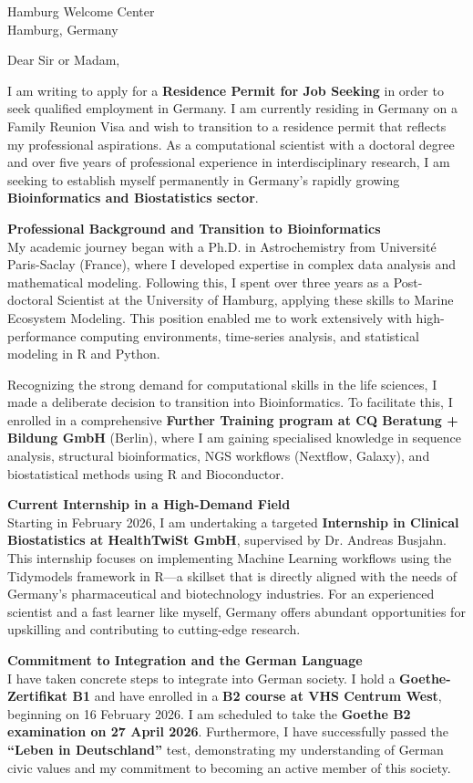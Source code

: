 \documentclass[fontsize=12pt,paper=a4,parskip=half]{scrlttr2}
\begin{document}
\begin{letter}{Hamburg Welcome Center\\Hamburg, Germany}

\opening{Dear Sir or Madam,}

I am writing to apply for a \textbf{Residence Permit for Job Seeking} in order to seek qualified employment in Germany. I am currently residing in Germany on a Family Reunion Visa and wish to transition to a residence permit that reflects my professional aspirations. As a computational scientist with a doctoral degree and over five years of professional experience in interdisciplinary research, I am seeking to establish myself permanently in Germany's rapidly growing \textbf{Bioinformatics and Biostatistics sector}.

\textbf{Professional Background and Transition to Bioinformatics}\\
My academic journey began with a Ph.D. in Astrochemistry from Université Paris-Saclay (France), where I developed expertise in complex data analysis and mathematical modeling. Following this, I spent over three years as a Post-doctoral Scientist at the University of Hamburg, applying these skills to Marine Ecosystem Modeling. This position enabled me to work extensively with high-performance computing environments, time-series analysis, and statistical modeling in R and Python.

Recognizing the strong demand for computational skills in the life sciences, I made a deliberate decision to transition into Bioinformatics. To facilitate this, I enrolled in a comprehensive \textbf{Further Training program at CQ Beratung + Bildung GmbH} (Berlin), where I am gaining specialised knowledge in sequence analysis, structural bioinformatics, NGS workflows (Nextflow, Galaxy), and biostatistical methods using R and Bioconductor.

\textbf{Current Internship in a High-Demand Field}\\
Starting in February 2026, I am undertaking a targeted \textbf{Internship in Clinical Biostatistics at HealthTwiSt GmbH}, supervised by Dr. Andreas Busjahn. This internship focuses on implementing Machine Learning workflows using the Tidymodels framework in R---a skillset that is directly aligned with the needs of Germany's pharmaceutical and biotechnology industries. For an experienced scientist and a fast learner like myself, Germany offers abundant opportunities for upskilling and contributing to cutting-edge research.

\textbf{Commitment to Integration and the German Language}\\
I have taken concrete steps to integrate into German society. I hold a \textbf{Goethe-Zertifikat B1} and have enrolled in a \textbf{B2 course at VHS Centrum West}, beginning on 16 February 2026. I am scheduled to take the \textbf{Goethe B2 examination on 27 April 2026}. Furthermore, I have successfully passed the \textbf{``Leben in Deutschland''} test, demonstrating my understanding of German civic values and my commitment to becoming an active member of this society.


\end{letter}
\end{document}
